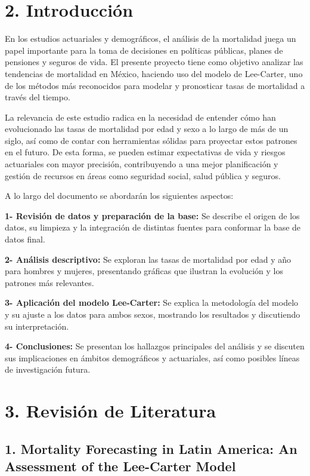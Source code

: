 \documentclass[
]{article}
\begin{document}
\hypertarget{introducciuxf3n}{%
\section{2. Introducción}\label{introducciuxf3n}}

En los estudios actuariales y demográficos, el análisis de la mortalidad
juega un papel importante para la toma de decisiones en políticas
públicas, planes de pensiones y seguros de vida. El presente proyecto
tiene como objetivo analizar las tendencias de mortalidad en México,
haciendo uso del modelo de Lee-Carter, uno de los métodos más
reconocidos para modelar y pronosticar tasas de mortalidad a través del
tiempo.

La relevancia de este estudio radica en la necesidad de entender cómo
han evolucionado las tasas de mortalidad por edad y sexo a lo largo de
más de un siglo, así como de contar con herramientas sólidas para
proyectar estos patrones en el futuro. De esta forma, se pueden estimar
expectativas de vida y riesgos actuariales con mayor precisión,
contribuyendo a una mejor planificación y gestión de recursos en áreas
como seguridad social, salud pública y seguros.

A lo largo del documento se abordarán los siguientes aspectos:

\textbf{1- Revisión de datos y preparación de la base:} Se describe el
origen de los datos, su limpieza y la integración de distintas fuentes
para conformar la base de datos final.

\textbf{2- Análisis descriptivo:} Se exploran las tasas de mortalidad
por edad y año para hombres y mujeres, presentando gráficas que ilustran
la evolución y los patrones más relevantes.

\textbf{3- Aplicación del modelo Lee-Carter:} Se explica la metodología
del modelo y su ajuste a los datos para ambos sexos, mostrando los
resultados y discutiendo su interpretación.

\textbf{4- Conclusiones:} Se presentan los hallazgos principales del
análisis y se discuten sus implicaciones en ámbitos demográficos y
actuariales, así como posibles líneas de investigación futura.

\hypertarget{revisiuxf3n-de-literatura}{%
\section{3. Revisión de Literatura}\label{revisiuxf3n-de-literatura}}

\hypertarget{mortality-forecasting-in-latin-america-an-assessment-of-the-lee-carter-model}{%
\subsection{1. Mortality Forecasting in Latin America: An Assessment of
the Lee-Carter
Model}\label{mortality-forecasting-in-latin-america-an-assessment-of-the-lee-carter-model}}
\end{document}
